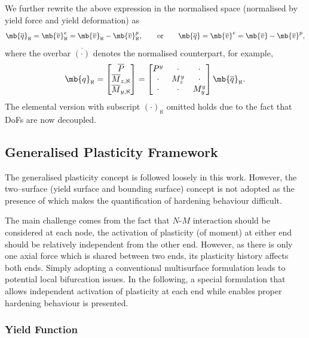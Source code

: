 We further rewrite the above expression in the normalised space (normalised by yield force and yield deformation) as
\begin{gather}
\mb{\overline{q}}_\aleph=\mb{\overline{v}}_\aleph^e=\mb{\overline{v}}_\aleph-\mb{\overline{v}}_\aleph^p,\qquad\text{or}\qquad
\mb{\overline{q}}=\mb{\overline{v}}^e=\mb{\overline{v}}-\mb{\overline{v}}^p,
\end{gather}
where the overbar $\overline{\left(\cdot\right)}$ denotes the normalised counterpart, for example,
\begin{gather}\label{eq:nm_normalisedq}
\mb{q}_\aleph=\begin{bmatrix}
\overline{P}\\
\overline{M}_{z,\aleph}\\
\overline{M}_{y,\aleph}
\end{bmatrix}=\begin{bmatrix}
P^y&\cdot&\cdot\\\cdot&M_z^y&\cdot\\\cdot&\cdot&M_y^y
\end{bmatrix}\mb{\overline{q}}_\aleph.
\end{gather}
The elemental version with subscript $\left(\cdot\right)_\aleph$ omitted holds due to the fact that DoFs are now decoupled.
\subsection{Generalised Plasticity Framework}
The generalised plasticity concept \cite{Auricchio1994} is followed loosely in this work. However, the two--surface (yield surface and bounding surface) concept is not adopted as the presence of which makes the quantification of hardening behaviour difficult.

The main challenge comes from the fact that $N$-$M$ interaction should be considered at each node, the activation of plasticity (of moment) at either end should be relatively independent from the other end. However, as there is only one axial force which is shared between two ends, its plasticity history affects both ends. Simply adopting a conventional multisurface formulation \cite{Simo1998} leads to potential local bifurcation issues. In the following, a special formulation that allows independent activation of plasticity at each end while enables proper hardening behaviour is presented.
\subsubsection{Yield Function}
